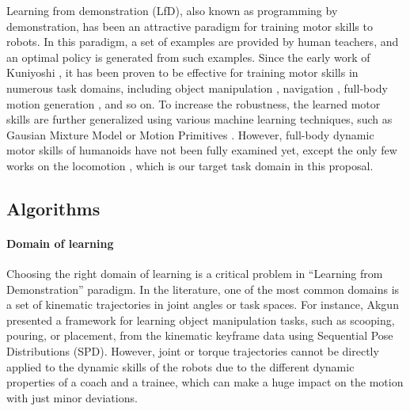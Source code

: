\indent

Learning from demonstration (LfD), also known as programming by demonstration,
has been an attractive paradigm for training motor skills to robots.
In this paradigm, a set of examples are provided by human teachers,
and an optimal policy is generated from such examples.
Since the early work of Kuniyoshi \etal \cite{kuniyoshi:1989:TBS},
it has been proven to be effective for training motor skills in
numerous task domains, including object manipulation 
\cite{Atkeson:1997:RLD,Calinon:2007:LRG,Ueda:2010:MNH},
navigation \cite{Konidaris:2011:RLD}, 
full-body motion generation \cite{Kulic:2011:ILF}, and so on.
To increase the robustness, the learned motor skills are further 
generalized using various machine learning techniques,
such as Gausian Mixture Model \cite{Calinon:2007:LRG} or
Motion Primitives \cite{Pastor:2009:LGM}.
However, full-body dynamic motor skills of humanoids have
not been fully examined yet, except the only few works on the
locomotion \cite{Nakanishi:2004:LDA},
which is our target task domain in this proposal.

\subsection{Algorithms}

\paragraph{Domain of learning}

Choosing the right domain of learning is a critical problem 
in ``Learning from Demonstration'' paradigm.
In the literature, one of the most common domains is a set of kinematic
trajectories in joint angles or task spaces.
For instance, Akgun \etal \cite{Akgun:2011:KLD} presented a framework
for learning object manipulation tasks, such as scooping, pouring, or 
placement, from the kinematic keyframe data using 
Sequential Pose Distributions (SPD).
However, joint or torque trajectories cannot be directly applied to the
dynamic skills of the robots  due to the different dynamic properties 
of a coach and a trainee, which can make a huge impact on the motion
with just minor deviations.

